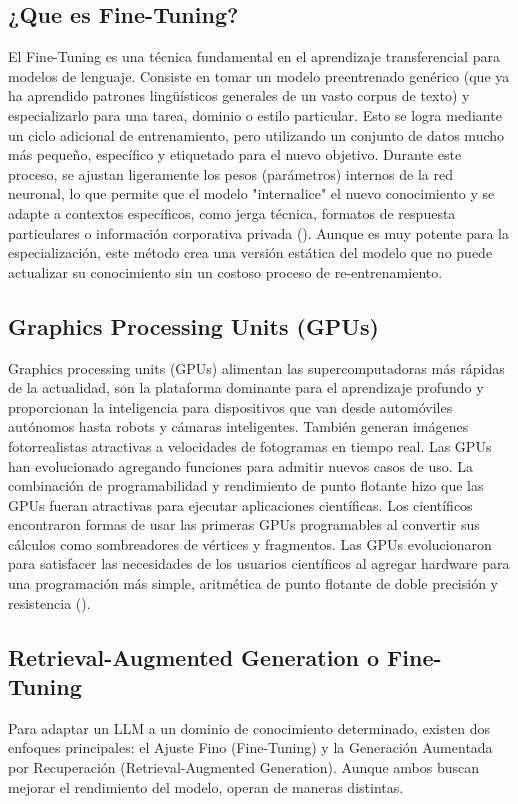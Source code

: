 {{\begin{listaenumerada}
\end{listaenumerada}

\subsection{¿Que es Fine-Tuning?}
El Fine-Tuning es una técnica fundamental en el aprendizaje transferencial para modelos de lenguaje. Consiste en tomar un modelo preentrenado genérico (que ya ha aprendido patrones lingüísticos generales de un vasto corpus de texto) y especializarlo para una tarea, dominio o estilo particular. Esto se logra mediante un ciclo adicional de entrenamiento, pero utilizando un conjunto de datos mucho más pequeño, específico y etiquetado para el nuevo objetivo. Durante este proceso, se ajustan ligeramente los pesos (parámetros) internos de la red neuronal, lo que permite que el modelo "internalice" el nuevo conocimiento y se adapte a contextos específicos, como jerga técnica, formatos de respuesta particulares o información corporativa privada (\cite{howard2018universal}). Aunque es muy potente para la especialización, este método crea una versión estática del modelo que no puede actualizar su conocimiento sin un costoso proceso de re-entrenamiento.  

\subsection{Graphics Processing Units (GPUs)}
Graphics processing units (GPUs) alimentan las supercomputadoras más rápidas de la actualidad, son la plataforma dominante para el aprendizaje profundo y proporcionan la inteligencia para dispositivos que van desde automóviles autónomos hasta robots y cámaras inteligentes. También generan imágenes fotorrealistas atractivas a velocidades de fotogramas en tiempo real. Las GPUs han evolucionado agregando funciones para admitir nuevos casos de uso. La combinación de programabilidad y rendimiento de punto flotante hizo que las GPUs fueran atractivas para ejecutar aplicaciones científicas. Los científicos encontraron formas de usar las primeras GPUs programables al convertir sus cálculos como sombreadores de vértices y fragmentos. Las GPUs evolucionaron para satisfacer las necesidades de los usuarios científicos al agregar hardware para una programación más simple, aritmética de punto flotante de doble precisión y resistencia (\cite{dally2021evolution}). 

\subsection{Retrieval-Augmented Generation o Fine-Tuning}
Para adaptar un LLM a un dominio de conocimiento determinado, existen dos enfoques principales: el Ajuste Fino (Fine-Tuning) y la Generación Aumentada por Recuperación (Retrieval-Augmented Generation). Aunque ambos buscan mejorar el rendimiento del modelo, operan de maneras distintas.

}}
